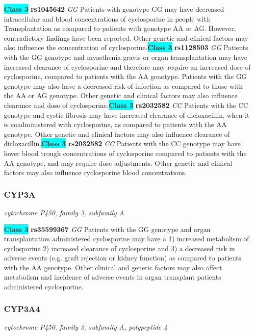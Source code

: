 \documentclass{report}
\begin{document}
\textbf{\colorbox{cyan} {Class 3}} \textbf{ rs1045642 } \textit{ GG }
Patients with genotype GG may have decreased intracellular and blood concentrations of cyclosporine in people with Transplantation as compared to patients with genotype AA or AG. However, contradictory findings have been reported. Other genetic and clinical factors may also influence the concentration of cyclosporine.\newline\textbf{\colorbox{cyan} {Class 3}} \textbf{ rs1128503 } \textit{ GG }
Patients with the GG genotype and myasthenia gravis or organ transplantation may have increased clearance of cyclosporine and therefore may require an increased dose of cyclosporine, compared to patients with the AA genotype. Patients with the GG genotype may also have a decreased risk of infection as compared to those with the AA or AG genotype. Other genetic and clinical factors may also influence clearance and dose of cyclosporine.\newline\textbf{\colorbox{cyan} {Class 3}} \textbf{ rs2032582 } \textit{ CC }
Patients with the CC genotype and cystic fibrosis may have increased clearance of dicloxacillin, when it is coadministered with cyclosporine, as compared to patients with the AA genotype. Other genetic and clinical factors may also influence clearance of dicloxacillin.\newline\textbf{\colorbox{cyan} {Class 3}} \textbf{ rs2032582 } \textit{ CC }
Patients with the CC genotype may have lower blood trough concentrations of cyclosporine compared to patients with the AA genotype, and may require dose adjustments. Other genetic and clinical factors may also influence cyclosporine blood concentrations.\newline\subsubsection{ CYP3A }
\textit{ cytochrome P450, family 3, subfamily A }

\textbf{\colorbox{cyan} {Class 3}} \textbf{ rs35599367 } \textit{ GG }
Patients with the GG genotype and organ transplantation administered cyclosporine may have a 1) increased metabolism of cyclosporine 2) increased clearance of cyclosporine and 3) a decreased risk in adverse events (e.g. graft rejection or kidney function) as compared to patients with the AA genotype. Other clinical and genetic factors may also affect metabolism and incidence of adverse events in organ transplant patients administered cyclosporine. \newline\subsubsection{ CYP3A4 }
\textit{ cytochrome P450, family 3, subfamily A, polypeptide 4 }
\end{document}

